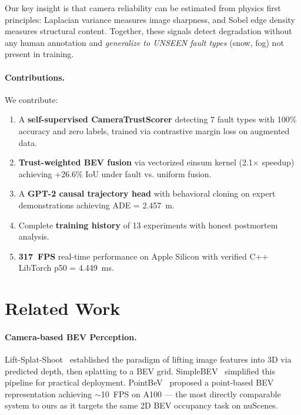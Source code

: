 \documentclass[10pt,twocolumn]{article}
\begin{document}
Our key insight is that camera reliability can be estimated from
physics first principles: Laplacian variance measures image sharpness,
and Sobel edge density measures structural content. Together, these
signals detect degradation without any human annotation and
\textit{generalize to UNSEEN fault types} (snow, fog) not present in
training.

\paragraph{Contributions.} We contribute:
\begin{enumerate}[leftmargin=*,topsep=2pt,itemsep=1pt]
  \item A \textbf{self-supervised CameraTrustScorer} detecting 7 fault
        types with 100\% accuracy and zero labels, trained via
        contrastive margin loss on augmented data.
  \item \textbf{Trust-weighted BEV fusion} via vectorized einsum kernel
        (2.1$\times$ speedup) achieving +26.6\% IoU under fault vs.
        uniform fusion.
  \item A \textbf{GPT-2 causal trajectory head} with behavioral cloning
        on expert demonstrations achieving ADE = 2.457~m.
  \item Complete \textbf{training history} of 13 experiments with
        honest postmortem analysis.
  \item \textbf{317~FPS} real-time performance on Apple Silicon with
        verified C++ LibTorch p50 = 4.449~ms.
\end{enumerate}

\section{Related Work}
\label{sec:related}

\paragraph{Camera-based BEV Perception.}
Lift-Splat-Shoot~\cite{philion2020lss} established the paradigm of
lifting image features into 3D via predicted depth, then splatting to
a BEV grid. SimpleBEV~\cite{harley2023simplebev} simplified this
pipeline for practical deployment. PointBeV~\cite{chambon2024pointbev}
proposed a point-based BEV representation achieving $\sim$10~FPS on
A100 --- the most directly comparable system to ours as it targets the
same 2D BEV occupancy task on nuScenes.
\end{document}
